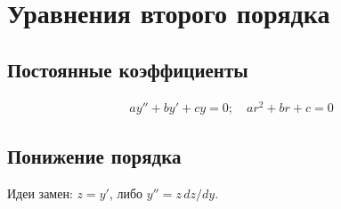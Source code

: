 \section{Уравнения второго порядка}
\subsection{Постоянные коэффициенты}
\begin{align}
ay'' + by' + cy = 0; \quad ar^2 + br + c = 0
\end{align}

\subsection{Понижение порядка}
Идеи замен: $z = y'$, либо $y'' = z\,dz/dy$.


